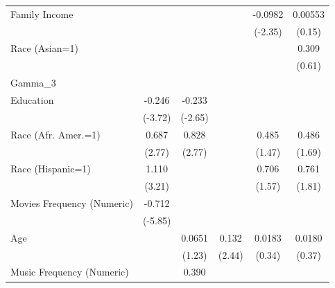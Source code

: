 {\begin{longtable}{l*{5}{c}}
Family Income       &                   &                   &                   &     -0.0982\sym{*}&     0.00553       \\
                    &                   &                   &                   &     (-2.35)       &      (0.15)       \\
Race (Asian=1)      &                   &                   &                   &                   &       0.309       \\
                    &                   &                   &                   &                   &      (0.61)       \\
\midrule
Gamma\_3             &                   &                   &                   &                   &                   \\
Education           &      -0.246\sym{*}&      -0.233\sym{*}&                   &                   &                   \\
                    &     (-3.72)       &     (-2.65)       &                   &                   &                   \\
Race (Afr. Amer.=1) &       0.687\sym{*}&       0.828\sym{*}&                   &       0.485       &       0.486\sym{*}\\
                    &      (2.77)       &      (2.77)       &                   &      (1.47)       &      (1.69)       \\
Race (Hispanic=1)   &       1.110\sym{*}&                   &                   &       0.706       &       0.761\sym{*}\\
                    &      (3.21)       &                   &                   &      (1.57)       &      (1.81)       \\
Movies Frequency (Numeric)&      -0.712\sym{*}&                   &                   &                   &                   \\
                    &     (-5.85)       &                   &                   &                   &                   \\
Age                 &                   &      0.0651       &       0.132\sym{*}&      0.0183       &      0.0180       \\
                    &                   &      (1.23)       &      (2.44)       &      (0.34)       &      (0.37)       \\
Music Frequency (Numeric)&                   &       0.390\sym{*}&                   &                   &                   \\

\end{longtable}}
